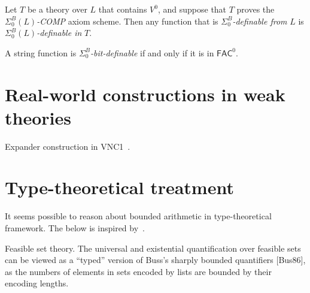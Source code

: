 \begin{corollary}[V.4.13]
Let \(T\) be a theory over \(L\) that contains \(V^0\), and suppose that \(T\) proves the 
\(\Sigma^B_0(L)\)\textit{-COMP} axiom scheme.  
Then any function that is \(\Sigma^B_0\)\textit{-definable from} \(L\) is 
\(\Sigma^B_0(L)\)\textit{-definable in} \(T\).
\end{corollary}


\begin{proposition}[V.4.7]
A string function is \(\Sigma^B_0\)\textit{-bit-definable} if and only if it is in \(\mathsf{FAC}^0\).
\end{proposition}

\begin{corollary}[V.2.4]
\leavevmode
\end{corollary} 



\section{Real-world constructions in weak theories}
Expander construction in VNC1~\cite{BUSS2020102796}.

\section{Type-theoretical treatment}
It seems possible to reason about bounded arithmetic in type-theoretical framework.
The below is inspired by~\cite{Li2025FeasibleMathematics}.

Feasible set theory. The universal and existential quantification over feasible sets
can be viewed as a “typed” version of Buss’s sharply bounded quantifiers [Bus86],
as the numbers of elements in sets encoded by lists are bounded by their encoding
lengths.


 


